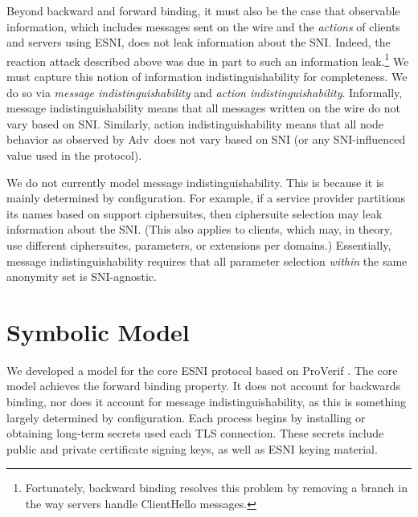 \documentclass{article}
\newcommand{\adv}{{\sf Adv}}
\theoremstyle{definition}
\begin{document}
Beyond backward and forward binding, it must also be the case that observable information, which includes 
messages sent on the wire and the \emph{actions} of clients and servers using ESNI, does not leak information
about the SNI. Indeed, the reaction attack described above was due in part to such an information 
leak.\footnote{Fortunately, backward binding resolves this problem by removing a branch in the way servers
handle ClientHello messages.} We must capture this notion of information indistinguishability for completeness.
We do so via \emph{message indistinguishability} and \emph{action indistinguishability}. Informally, message 
indistinguishability means that all messages written on the wire do not vary based on SNI. Similarly, action
indistinguishability means that all node behavior as observed by \adv\ does not vary based on SNI (or any SNI-influenced
value used in the protocol). 

We do not currently model message indistinguishability. This is because it is mainly determined by configuration.
For example, if a service provider partitions its names based on support ciphersuites, then ciphersuite
selection may leak information about the SNI. (This also applies to clients, which may, in theory, use different
ciphersuites, parameters, or extensions per domains.) Essentially, message indistinguishability requires that
all parameter selection \emph{within} the same anonymity set is SNI-agnostic.

\section{Symbolic Model}

We developed a model for the core ESNI protocol based on ProVerif \cite{blanchet2016modeling}. 
The core model achieves the forward binding property. It does not account for backwards binding, nor does it
account for message indistinguishability, as this is something largely determined by configuration. Each process 
begins by installing or obtaining long-term secrets used each TLS connection. These secrets include public and 
private certificate signing keys, as well as ESNI keying material.
\end{document}
